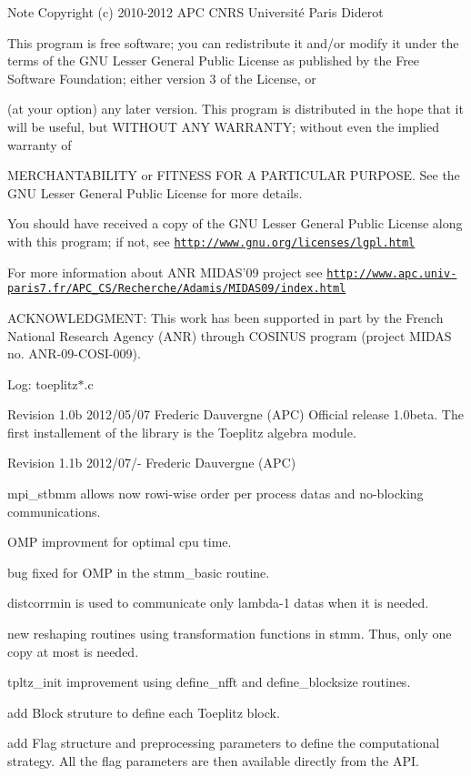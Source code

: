 \begin{DoxyNote}{Note}
Copyright (c) 2010-\/2012 A\-P\-C C\-N\-R\-S Université Paris Diderot 



This program is free software; you can redistribute it and/or modify it under the terms of the G\-N\-U Lesser General Public License as published by the Free Software Foundation; either version 3 of the License, or 

(at your option) any later version. This program is distributed in the hope that it will be useful, but W\-I\-T\-H\-O\-U\-T A\-N\-Y W\-A\-R\-R\-A\-N\-T\-Y; without even the implied warranty of 

M\-E\-R\-C\-H\-A\-N\-T\-A\-B\-I\-L\-I\-T\-Y or F\-I\-T\-N\-E\-S\-S F\-O\-R A P\-A\-R\-T\-I\-C\-U\-L\-A\-R P\-U\-R\-P\-O\-S\-E. See the G\-N\-U Lesser General Public License for more details. 



You should have received a copy of the G\-N\-U Lesser General Public License along with this program; if not, see \href{http://www.gnu.org/licenses/lgpl.html}{\tt http\-://www.\-gnu.\-org/licenses/lgpl.\-html} 

For more information about A\-N\-R M\-I\-D\-A\-S'09 project see \href{http://www.apc.univ-paris7.fr/APC_CS/Recherche/Adamis/MIDAS09/index.html}{\tt http\-://www.\-apc.\-univ-\/paris7.\-fr/\-A\-P\-C\-\_\-\-C\-S/\-Recherche/\-Adamis/\-M\-I\-D\-A\-S09/index.\-html} 

A\-C\-K\-N\-O\-W\-L\-E\-D\-G\-M\-E\-N\-T\-: This work has been supported in part by the French National Research Agency (A\-N\-R) through C\-O\-S\-I\-N\-U\-S program (project M\-I\-D\-A\-S no. A\-N\-R-\/09-\/\-C\-O\-S\-I-\/009).
\end{DoxyNote}
Log\-: toeplitz$\ast$.c

Revision 1.\-0b 2012/05/07 Frederic Dauvergne (A\-P\-C) Official release 1.\-0beta. The first installement of the library is the Toeplitz algebra module.

Revision 1.\-1b 2012/07/-\/ Frederic Dauvergne (A\-P\-C)
\begin{DoxyItemize}
\item mpi\-\_\-stbmm allows now rowi-\/wise order per process datas and no-\/blocking communications.
\item O\-M\-P improvment for optimal cpu time.
\item bug fixed for O\-M\-P in the stmm\-\_\-basic routine.
\item distcorrmin is used to communicate only lambda-\/1 datas when it is needed.
\item new reshaping routines using transformation functions in stmm. Thus, only one copy at most is needed.
\item tpltz\-\_\-init improvement using define\-\_\-nfft and define\-\_\-blocksize routines.
\item add Block struture to define each Toeplitz block.
\item add Flag structure and preprocessing parameters to define the computational strategy. All the flag parameters are then available directly from the A\-P\-I. 
\end{DoxyItemize}


